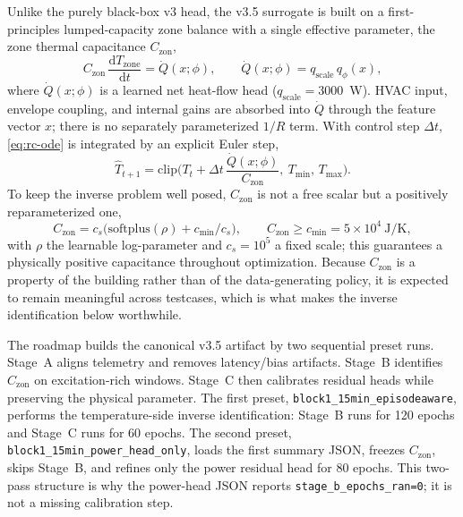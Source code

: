 \documentclass[11pt,a4paper]{article}
\newcommand{\Czon}{\ensuremath{C_{\mathrm{zon}}}}
\newcommand{\That}{\ensuremath{\widehat{T}}}
\begin{document}
Unlike the purely black-box v3 head, the v3.5 surrogate is built on a first-principles lumped-capacity zone balance with a single effective parameter, the zone thermal capacitance \(\Czon\),
\begin{equation}
  \Czon\,\frac{\mathrm{d}T_{\mathrm{zone}}}{\mathrm{d}t} = \dot{Q}(x;\phi),
  \qquad \dot{Q}(x;\phi)=q_{\mathrm{scale}}\,q_\phi(x),
  \label{eq:rc-ode}
\end{equation}
where \(\dot{Q}(x;\phi)\) is a learned net heat-flow head (\(q_{\mathrm{scale}}=3000\)~W). HVAC input, envelope coupling, and internal gains are absorbed into \(\dot{Q}\) through the feature vector \(x\); there is no separately parameterized \(1/R\) term. With control step \(\Delta t\), \eqref{eq:rc-ode} is integrated by an explicit Euler step,
\begin{equation}
  \That_{t+1} = \mathrm{clip}\!\Big(T_t + \Delta t\,\frac{\dot{Q}(x;\phi)}{\Czon},\ T_{\min},\,T_{\max}\Big).
  \label{eq:rc-euler}
\end{equation}
To keep the inverse problem well posed, \(\Czon\) is not a free scalar but a positively reparameterized one,
\begin{equation}
  \Czon = c_s\big(\mathrm{softplus}(\rho) + c_{\min}/c_s\big),
  \qquad \Czon \ge c_{\min} = 5\times10^4~\mathrm{J/K},
  \label{eq:czon-reparam}
\end{equation}
with \(\rho\) the learnable log-parameter and \(c_s=10^5\) a fixed scale; this guarantees a physically positive capacitance throughout optimization. Because \(\Czon\) is a property of the building rather than of the data-generating policy, it is expected to remain meaningful across testcases, which is what makes the inverse identification below worthwhile.

The roadmap builds the canonical v3.5 artifact by two sequential preset runs. Stage~A aligns telemetry and removes latency/bias artifacts. Stage~B identifies \(\Czon\) on excitation-rich windows. Stage~C then calibrates residual heads while preserving the physical parameter. The first preset, \texttt{block1\_15min\_episodeaware}, performs the temperature-side inverse identification: Stage~B runs for 120 epochs and Stage~C runs for 60 epochs. The second preset, \texttt{block1\_15min\_power\_head\_only}, loads the first summary JSON, freezes \(\Czon\), skips Stage~B, and refines only the power residual head for 80 epochs. This two-pass structure is why the power-head JSON reports \texttt{stage\_b\_epochs\_ran=0}; it is not a missing calibration step.
\end{document}
